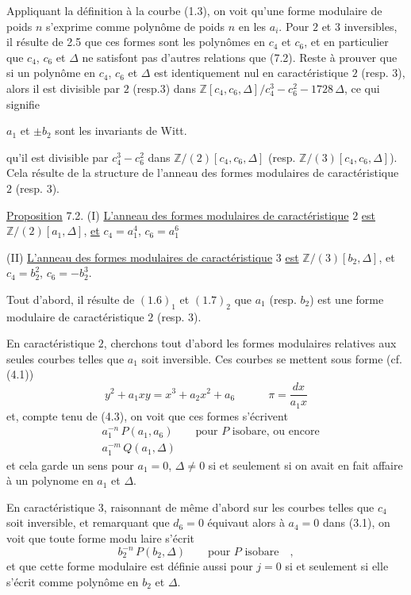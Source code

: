 Appliquant la définition à la courbe (1.3), on voit qu'une forme modulaire  de poids $n$ s'exprime comme polynôme de poids $n$ en les $a_i$. Pour $2$ et $3$ inversibles, il résulte de 2.5 que ces formes sont les polynômes en $c_4$ et $c_6$, et en particulier que $c_4$, $c_6$ et $\Delta$ ne satisfont pas d'autres relations que (7.2). Reste à prouver que si un polynôme en $c_4$, $c_6$ et $\Delta$ est identiquement nul en caractéristique $2$ (resp. $3$), alors il est divisible par $2$ (resp.$3$) dans $\mathbb{Z}[c_4,c_6,\Delta]/c_4^3-c_6^2-1728\,\Delta$, ce qui signifie


$a_1$ et $\pm b_2$ sont les invariants de  Witt.


qu'il est divisible par $c_4^3-c_6^2$ dans $\mathbb{Z}/(2)[c_4,c_6,\Delta]$ (resp. $\mathbb{Z}/(3)[c_4,c_6,\Delta]$). Cela résulte de la structure de l'anneau des formes modulaires de caractéristique $2$ (resp. $3$).

\uline{Proposition} 7.2. (I) \uline{L'anneau des formes modulaires de caractéristique} $2$ \uline{est} $\mathbb{Z}/(2)[a_1,\Delta]$, \uline{et} $c_4=a_1^4$, $c_6=a_1^6$

(II) \uline{L'anneau des formes modulaires de caractéristique} $3$ \uline{est} $\mathbb{Z}/(3)[b_2,\Delta]$, et $c_4=b_2^2$, $c_6=-b_2^3$.

Tout d'abord, il résulte de $(1.6)_1$ et $(1.7)_2$ que $a_1$ (resp. $b_2$) est une forme modulaire de caractéristique $2$ (resp. $3$).

En caractéristique $2$, cherchons tout d'abord les formes modulaires relatives aux seules courbes telles que $a_1$ soit inversible. Ces courbes se mettent sous forme (cf. (4.1))
\[
y^2+a_1xy=x^3+a_2x^2+a_6\qquad\quad\pi=\frac{dx}{a_1x}
\]
et, compte tenu de (4.3), on voit que ces formes s'écrivent
\[
\begin{aligned}
&a_1^{-n}\,P(a_1,a_6)\qquad\text{pour }P\text{ isobare, ou encore}\\
&a_1^{-m}\,Q(a_1,\Delta)
\end{aligned}
\]
et cela garde un sens pour $a_1=0$, $\Delta\ne0$ si et seulement si on avait en fait affaire à un polynome en $a_1$ et $\Delta$.

En caractéristique $3$, raisonnant de même d'abord sur les courbes telles que $c_4$ soit inversible, et remarquant que $d_6=0$ équivaut alors à $a_4=0$ dans (3.1), on voit que toute forme modu%
%
laire s'écrit
\[
b_2^{-n}\,P(b_2,\Delta)\qquad\text{pour }P\text{ isobare}\quad,
\]
et que cette forme modulaire est définie aussi pour $j=0$ si et seulement si elle s'écrit comme polynôme en $b_2$ et $\Delta$.

